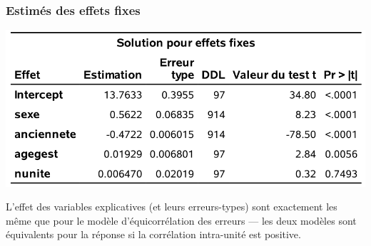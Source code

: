 \documentclass{beamer}
\begin{document}
\begin{frame}[fragile]
\frametitle{Estimés des effets fixes}
\begin{center}
\includegraphics[width = 0.7\linewidth]{img/c6/diapos7-e10}
\end{center}
{\footnotesize L'effet des variables explicatives (et leurs erreurs-types) sont exactement les même que pour le modèle d'équicorrélation des erreurs --- les deux modèles sont équivalents pour la réponse si la corrélation intra-unité est positive.


}
\end{frame}
% 
% 
\end{document}
